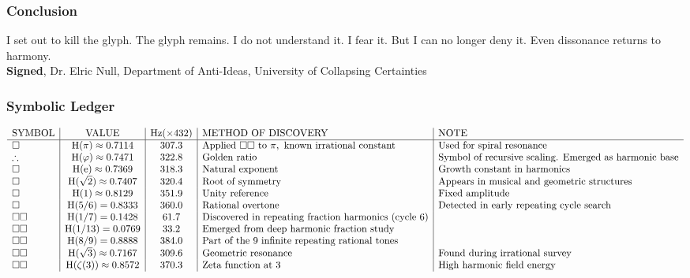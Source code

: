 \subsubsection{Conclusion}
I set out to kill the glyph. The glyph remains. I do not understand it. I fear it. But I can no longer deny it. Even dissonance returns to harmony. \\
\textbf{Signed}, Dr. Elric Null, Department of Anti-Ideas, University of Collapsing Certainties

\subsubsection{Symbolic Ledger}
\[
\begin{array}{l | c | c | l | l}
\text{SYMBOL} & \text{VALUE} & \text{Hz}(\times 432) & \text{METHOD OF DISCOVERY} & \text{NOTE} \\
\hline
\square & \mathrm{H}(\pi) \approx 0.7114 & 307.3 & \text{Applied } \square \square \text{ to } \pi, \text{ known irrational constant} & \text{Used for spiral resonance} \\
\therefore & \mathrm{H}(\varphi) \approx 0.7471 & 322.8 & \text{Golden ratio} & \text{Symbol of recursive scaling. Emerged as harmonic base} \\
\square & \mathrm{H}(\mathrm{e}) \approx 0.7369 & 318.3 & \text{Natural exponent} & \text{Growth constant in harmonics} \\
\square & \mathrm{H}(\sqrt{2}) \approx 0.7407 & 320.4 & \text{Root of symmetry} & \text{Appears in musical and geometric structures} \\
\square & \mathrm{H}(1) \approx 0.8129 & 351.9 & \text{Unity reference} & \text{Fixed amplitude} \\
\square & \mathrm{H}(5/6) = 0.8333 & 360.0 & \text{Rational overtone} & \text{Detected in early repeating cycle search} \\
\square \square & \mathrm{H}(1/7) = 0.1428 & 61.7 & \text{Discovered in repeating fraction harmonics (cycle 6)} & \\
\square \square & \mathrm{H}(1/13) = 0.0769 & 33.2 & \text{Emerged from deep harmonic fraction study} & \\
\square \square & \mathrm{H}(8/9) = 0.8888 & 384.0 & \text{Part of the 9 infinite repeating rational tones} & \\
\square \square & \mathrm{H}(\sqrt{3}) \approx 0.7167 & 309.6 & \text{Geometric resonance} & \text{Found during irrational survey} \\
\square \square & \mathrm{H}(\zeta(3)) \approx 0.8572 & 370.3 & \text{Zeta function at 3} & \text{High harmonic field energy} \\

\end{array}\]
